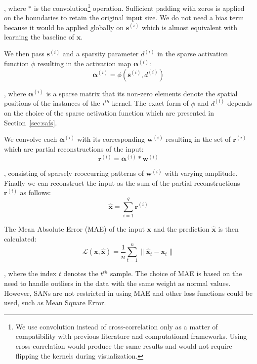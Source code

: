 \documentclass[journal]{IEEEtran}
\begin{document}
\noindent
, where $*$ is the convolution\footnote{We use convolution instead of cross-correlation only as a matter of compatibility with previous literature and computational frameworks. Using cross-correlation would produce the same results and would not require flipping the kernels during visualization.} operation.
Sufficient padding with zeros is applied on the boundaries to retain the original input size.
We do not need a bias term because it would be applied globally on $\bm{s}^{(i)}$ which is almost equivalent with learning the baseline of $\bm{x}$.

We then pass $\bm{s}^{(i)}$ and a sparsity parameter $d^{(i)}$ in the sparse activation function $\phi$ resulting in the activation map $\bm{\alpha}^{(i)}$:
\begin{equation}
  \label{eq:extrema}
  \bm{\alpha}^{(i)} = \phi(\bm{s}^{(i)}, d^{(i)})
\end{equation}

\noindent
, where $\bm{\alpha}^{(i)}$ is a sparse matrix that its non-zero elements denote the spatial positions of the instances of the $i^{th}$ kernel.
The exact form of $\phi$ and $d^{(i)}$ depends on the choice of the sparse activation function which are presented in Section~\ref{sec:safs}.

We convolve each $\bm{\alpha}^{(i)}$ with its corresponding $\bm{w}^{(i)}$ resulting in the set of $\bm{r}^{(i)}$ which are partial reconstructions of the input:
\begin{equation}
  \label{eq:reconstructions}
  \bm{r}^{(i)} = \bm{\alpha}^{(i)} * \bm{w}^{(i)}
\end{equation}

\noindent
, consisting of sparsely reoccurring patterns of $\bm{w}^{(i)}$ with varying amplitude.
Finally we can reconstruct the input as the sum of the partial reconstructions $\bm{r}^{(i)}$ as follows:
\begin{equation}
  \label{eq:output1}
  \hat{\bm{x}} = \sum\limits_{i=1}^q \bm{r}^{(i)}
\end{equation}

The Mean Absolute Error (MAE) of the input $\bm{x}$ and the prediction $\hat{\bm{x}}$ is then calculated:
\begin{equation}
  \label{eq:lossfunction}
  \mathcal{L}\left( {\bm{x},\hat{\bm{x}}} \right) = \frac{1}{n}\sum\limits_{t=1}^n \Big\lVert\hat{\bm{x}}_t - \bm{x}_t \Big\rVert
\end{equation}

\noindent
, where the index $t$ denotes the $t^{th}$ sample.
The choice of MAE is based on the need to handle outliers in the data with the same weight as normal values.
However, SANs are not restricted in using MAE and other loss functions could be used, such as Mean Square Error.
\end{document}
